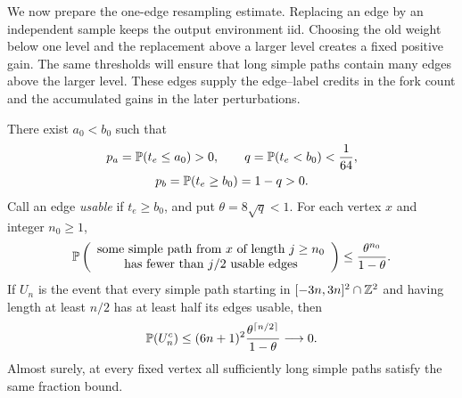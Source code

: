 We now prepare the one-edge resampling estimate. Replacing an edge by
an independent sample keeps the output environment iid. Choosing the old
weight below one level and the replacement above a larger level creates
a fixed positive gain. The same thresholds will ensure that long simple
paths contain many edges above the larger level. These edges supply the
edge--label credits in the fork count and the accumulated gains in the
later perturbations.

\begin{lemma}\label{lem:usable}
There exist $a_0<b_0$ such that
\begin{equation}\label{eq:low-usable-probabilities}
 \begin{gathered}
 p_a=\mathbb P(t_e\le a_0)>0,
 \qquad q=\mathbb P(t_e<b_0)<\frac1{64},\\
 p_b=\mathbb P(t_e\ge b_0)=1-q>0.
 \end{gathered}
\end{equation}
Call an edge \emph{usable} if $t_e\ge b_0$, and put
$\theta=8\sqrt q<1$.  For each vertex $x$ and integer $n_0\ge1$,
\begin{equation}\label{eq:usable-fixed-site}
 \mathbb P\left(
 \begin{array}{c}
 \text{some simple path from $x$ of length $j\ge n_0$}\\
 \text{has fewer than $j/2$ usable edges}
 \end{array}\right)
 \le\frac{\theta^{n_0}}{1-\theta}.
\end{equation}
If $U_n$ is the event that every simple path starting in
$[-3n,3n]^2\cap\mathbb Z^2$ and having length at least $n/2$ has at least half
its edges usable, then
\begin{equation}\label{eq:usable-box}
 \mathbb P(U_n^c)
 \le (6n+1)^2\frac{\theta^{\lceil n/2\rceil}}{1-\theta}
 \longrightarrow0.
\end{equation}
Almost surely, at every fixed vertex all sufficiently long simple paths
satisfy the same fraction bound.
\end{lemma}

